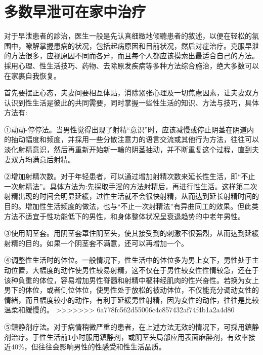 \documentclass[12pt,UTF8]{ctexbook}
\begin{document}
\section{多数早泄可在家中治疗}

对于早泄患者的診治，医生一般是先认真细緻地倾聽患者的敘述，以便在轻松的氛围中，瞭解掌握患病的状况，包括起病原因和目前状况，然后对症治疗。克服早泄的方法很多，应视原因不同而各异，而且每个人都应该摸索出最适合自己的方法。採用心理、性生活技巧、药物、去除原发疾病等多种方法综合施治，绝大多数可以在家裹自我恢复。

首先要摆正心态，夫妻间要相互体贴，消除紧张心理及一切焦慮因素，让夫妻双方认识到性生活是彼此的共同需要，同时掌握一些性生活的知识、方法与技巧，具体方法有:

①动动-停停法。当男性觉得出现了射精“意识”时，应该减慢或停止阴茎在阴道内的抽动幅度和频度，并採用一些分散注意力的语言交流或其他行为方法，往往可以淡化射精意识，然后再重新开始新一輪的阴茎抽动，并不断重复这个过程，直到夫妻双方均满意后射精。

②增加射精次数。对于年轻患者，可以通过增加射精次数来延长性生活，即“不止一次射精法”。具体方法为:先採取手淫的方法射精后，再进行性生活。这样第二次射精出现的时间会明显延緩，过性生活就不会很快射精，从而达到延长射精时间的目的。增加性生活频度的做法，也与“不止一次射精法”有异曲同工的效果。但此类方法不适宜于性功能低下的男性，和身体整体状况呈衰退趋势的中老年男性。

③使用阴茎套。用阴茎套罩住阴茎头，使其接受到的刺激不很强烈，从而达到延緩射精的目的。如果一个阴茎套不满意，还可以再增加一个。

④调整性生活时的体位。一般情况下，性生活中的体位多为男上女下，男性处于主动位置，大幅度的动作使男性较易射精，这不仅在于男性较女性性情较急，还在于该种負重的体位，容易增加男性脊髓和射精中樞神经肌肉的性兴奋性。若换为女上男下的体位，或者侧位体位，使男性处于放松的被动体位，不仅能充分调动女性的情緒，而且幅度较小的动作，有利于延緩男性射精，因为女性的动作，往往是比较温柔和緩慢的。
>>>>>>> 6a778fc562d55006c4c857432af74f4b1a2a4d80

⑤鎮静剂疗法。对于病情稍微严重的患者，在上述方法无效的情况下，可採用鎮静剂治疗。于性生活前1小时服用鎮静剂，或阴茎头局部应用表面麻醉剂，有效率接近40\%，但往往会影响男性的性感受和性生活品质。
\end{document}
